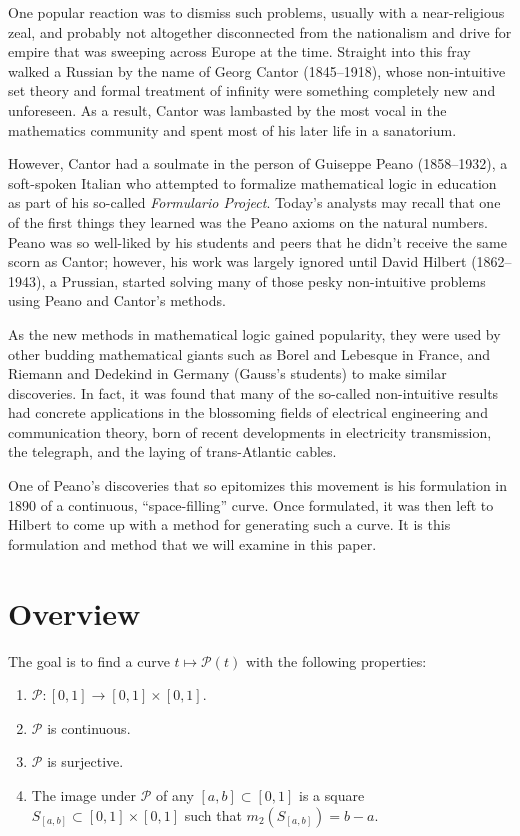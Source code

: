 \documentclass[letterpaper,12pt,fleqn,reqno]{amsart}
\newcommand{\uint}{[0,1]}
\newcommand{\usq}{\uint\times\uint}
\newcommand{\pc}{\mathcal{P}}
\theoremstyle{plain}
\begin{document}
One popular reaction was to dismiss such problems, usually with a
near-religious zeal, and probably not altogether disconnected from the
nationalism and drive for empire that was sweeping across Europe at the time.
Straight into this fray walked a Russian by the name of Georg Cantor
(1845--1918), whose non-intuitive set theory and formal treatment of infinity
were something completely new and unforeseen. As a result, Cantor was lambasted
by the most vocal in the mathematics community and spent most of his later life
in a sanatorium.

However, Cantor had a soulmate in the person of Guiseppe Peano (1858--1932), a
soft-spoken Italian who attempted to formalize mathematical logic in education
as part of his so-called \emph{Formulario Project}.  Today's analysts may
recall that one of the first things they learned was the Peano axioms on the
natural numbers.  Peano was so well-liked by his students and peers that he
didn't receive the same scorn as Cantor; however, his work was largely ignored
until David Hilbert (1862--1943), a Prussian, started solving many of those
pesky non-intuitive problems using Peano and Cantor's methods.

As the new methods in mathematical logic gained popularity, they were used by
other budding mathematical giants such as Borel and Lebesque in France, and
Riemann and Dedekind in Germany (Gauss's students) to make similar
discoveries. In fact, it was found that many of the so-called non-intuitive
results had concrete applications in the blossoming fields of electrical
engineering and communication theory, born of recent developments in
electricity transmission, the telegraph, and the laying of trans-Atlantic
cables.

One of Peano's discoveries that so epitomizes this movement is his formulation
in 1890 of a continuous, ``space-filling'' curve. Once formulated, it was then
left to Hilbert to come up with a method for generating such a curve.  It is
this formulation and method that we will examine in this paper.

\section{Overview}

The goal is to find a curve $t\mapsto\pc(t)$ with the following properties:
\begin{enumerate}
\item $\pc:\uint\to\usq$.
\item $\pc$ is continuous.
\item $\pc$ is surjective.
\item\label{prop:image} The image under $\pc$ of any $[a,b]\subset\uint$ is a
square $S_{[a,b]}\subset\usq$ such that $m_2(S_{[a,b]})=b-a$.
\end{enumerate}
\end{document}
